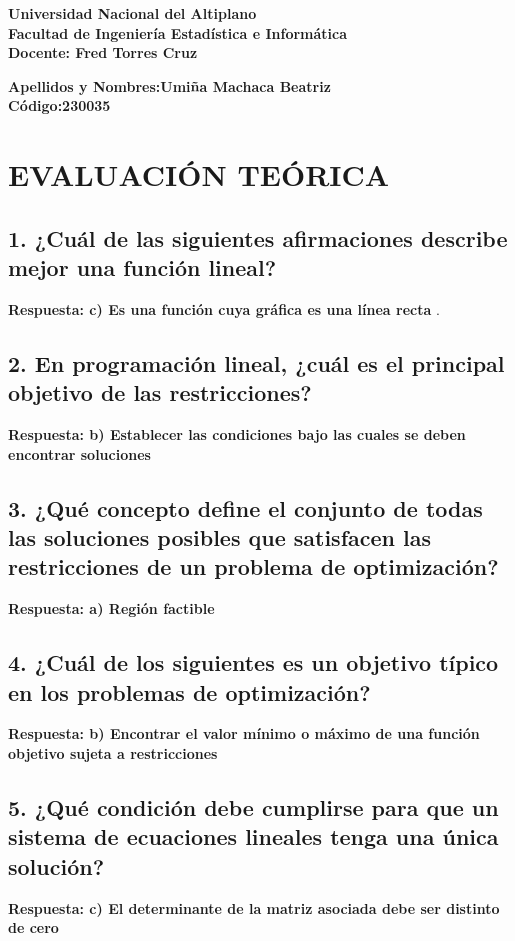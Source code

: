 \documentclass[12pt,a4paper]{article}
\begin{document}
\begin{center}

\textbf{Universidad Nacional del Altiplano}\\
\textbf{Facultad de Ingeniería Estadística e Informática}\\
\textbf{Docente: Fred Torres Cruz}\\[1cm]
\end{center}

\noindent\textbf{Apellidos y Nombres:Umiña Machaca Beatriz}\\ 
\noindent\textbf{Código:230035} 

\section{EVALUACIÓN TEÓRICA}

\subsection*{1. ¿Cuál de las siguientes afirmaciones describe mejor una función lineal?}
\textbf{Respuesta: c) Es una función cuya gráfica es una línea recta}
.

\subsection*{2. En programación lineal, ¿cuál es el principal objetivo de las restricciones?}
\textbf{Respuesta: b) Establecer las condiciones bajo las cuales se deben encontrar soluciones}


\subsection*{3. ¿Qué concepto define el conjunto de todas las soluciones posibles que satisfacen las restricciones de un problema de optimización?}
\textbf{Respuesta: a) Región factible}

\subsection*{4. ¿Cuál de los siguientes es un objetivo típico en los problemas de optimización?}
\textbf{Respuesta: b) Encontrar el valor mínimo o máximo de una función objetivo sujeta a restricciones}



\subsection*{5. ¿Qué condición debe cumplirse para que un sistema de ecuaciones lineales tenga una única solución?}
\textbf{Respuesta: c) El determinante de la matriz asociada debe ser distinto de cero}
\end{document}
